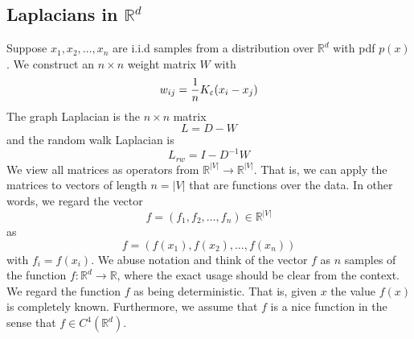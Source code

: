 \subsection{Laplacians in $\mathbb{R}^d$}

Suppose $x_1,x_2,\ldots,x_n$ are i.i.d samples from a distribution over $\mathbb{R}^d$ with pdf $p(x)$. We construct an $n\times n$ weight matrix $W$ with
$$w_{ij} = \frac{1}{n}K_\varepsilon(x_i-x_j)$$
The graph Laplacian is the $n\times n$ matrix $$L = D-W$$ and the random walk Laplacian is
$$L_{rw} = I - D^{-1}W$$
We view all matrices as operators from $\mathbb{R}^{|V|} \to \mathbb{R}^{|V|}$. That is, we can apply the matrices to vectors of length $n=|V|$ that are functions over the data. In other words, we regard the vector $$f=(f_1,f_2,\ldots,f_n)\in \mathbb{R}^{|V|}$$ as $$f = (f(x_1),f(x_2),\ldots,f(x_n))$$ with $f_i = f(x_i)$. We abuse notation and think of the vector $f$ as $n$ samples of the function $f : \mathbb{R}^d \to \mathbb{R}$, where the exact usage should be clear from the context. We regard the function $f$ as being deterministic. That is, given $x$ the value $f(x)$ is completely known. Furthermore, we assume that $f$ is a nice function in the sense that $f\in C^4(\mathbb{R}^d)$.

